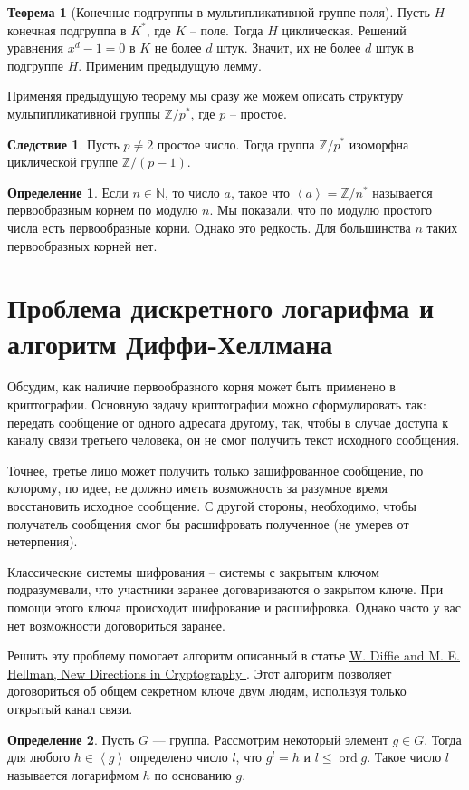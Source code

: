\documentclass[10pt,a4paper,oneside]{book}
\theoremstyle{definition}
\newtheorem*{defn}{\color{yellow!30!red} Определение}
\newtheorem{thm}{\color{red!40!black}Теорема}
\newtheorem{cor}{\color{green!45!black}Следствие}
\renewcommand{\leq}{\leqslant}
\newcommand{\mb}[1]{\mathbb{#1}}
\newcommand{\ord}{\operatorname{ord}}
\def\lan{\left\langle }
\def\ran{\right\rangle}
\def\thrm{\begin{thm}}
\def\ethrm{\end{thm}}
\def\dfn{\begin{defn}}
\def\edfn{\end{defn}}
\def\crl{\begin{cor}}
\def\ecrl{\end{cor}}
\begin{document}
\thrm[Конечные подгруппы в мультипликативной группе поля] Пусть $H$ -- конечная подгруппа в $K^*$, где $K$ -- поле. Тогда $H$ циклическая.
\proof Решений уравнения $x^d-1 = 0$ в $K$ не более $d$ штук. Значит, их не более $d$ штук в подгруппе $H$. Применим предыдущую лемму.
\endproof
\ethrm

Применяя предыдущую теорему мы сразу же можем описать структуру мульпипликативной группы $\mb Z/ p^*$, где $p$ -- простое.

\crl Пусть $p\neq 2$ простое число. Тогда группа $\mb Z/p^*$ изоморфна циклической группе $\mb Z/(p-1)$.
\ecrl

\dfn Если $n\in \mb N$, то число $a$, такое что $\lan a\ran =\mb Z/n^*$ называется первообразным корнем по модулю $n$. Мы показали, что по модулю простого числа есть первообразные корни. Однако это редкость. Для большинства $n$ таких первообразных корней нет.  
\edfn


\section{Проблема дискретного логарифма и алгоритм Диффи-Хеллмана}

Обсудим, как наличие первообразного корня может быть  применено в криптографии. Основную задачу криптографии можно сформулировать так: передать сообщение от одного адресата другому, так, чтобы в случае доступа к каналу связи третьего человека, он не смог получить текст исходного сообщения. 

Точнее, третье лицо может получить только зашифрованное сообщение, по которому, по идее, не должно иметь возможность за разумное время восстановить исходное сообщение. С другой стороны, необходимо, чтобы получатель сообщения смог бы расшифровать полученное (не умерев от нетерпения).

Классические системы шифрования -- системы с закрытым ключом подразумевали, что участники заранее договариваются о закрытом ключе. При помощи этого ключа происходит шифрование и расшифровка. Однако часто у вас нет возможности договориться заранее. 

Решить эту проблему помогает алгоритм описанный в статье \href{https://www-ee.stanford.edu/~hellman/publications/24.pdf}{W. Diffie and M. E. Hellman, New Directions in Cryptography }. Этот алгоритм позволяет договориться об общем секретном ключе двум людям, используя только открытый канал связи.

\dfn
Пусть $G$ --- группа. Рассмотрим некоторый элемент $g\in G$. Тогда для любого $h\in \lan g\ran$ определено число $l$, что $g^l=h$ и $l\leq \ord g$. Такое число $l$ называется логарифмом $h$ по основанию $g$.
\edfn
\end{document}
